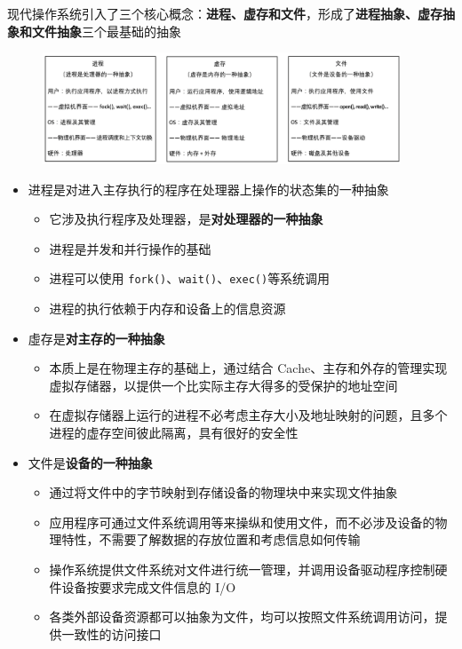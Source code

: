 \documentclass[cs4size,a4paper,10pt]{ctexart}
\begin{document}
		现代操作系统引入了三个核心概念：\textbf{进程、虚存和文件}，形成了\textbf{进程抽象、虚存抽象和文件抽象}三个最基础的抽象
		\begin{figure}[H]
			\centering
			\includegraphics[width=0.95\textwidth]{img/1.3.1.2}
		\end{figure}
		\begin{itemize}
			\item 进程是对进入主存执行的程序在处理器上操作的状态集的一种抽象
			\begin{itemize}
				\item 它涉及执行程序及处理器，是\textbf{对处理器的一种抽象}
				\item 进程是并发和并行操作的基础
				\item 进程可以使用 \verb|fork()|、\verb|wait()|、\verb|exec()|等系统调用
				\item 进程的执行依赖于内存和设备上的信息资源
			\end{itemize}
			\item 虛存是\textbf{对主存的一种抽象}
			\begin{itemize}
				\item 本质上是在物理主存的基础上，通过结合 Cache、主存和外存的管理实现虚拟存储器，以提供一个比实际主存大得多的受保护的地址空间
				\item 在虚拟存储器上运行的进程不必考虑主存大小及地址映射的问题，且多个进程的虚存空间彼此隔离，具有很好的安全性
			\end{itemize}
			\item 文件是\textbf{设备的一种抽象}
			\begin{itemize}
				\item 通过将文件中的字节映射到存储设备的物理块中来实现文件抽象
				\item 应用程序可通过文件系统调用等来操纵和使用文件，而不必涉及设备的物理特性，不需要了解数据的存放位置和考虑信息如何传输
				\item 操作系统提供文件系统对文件进行统一管理，并调用设备驱动程序控制硬件设备按要求完成文件信息的 I/O
				\item 各类外部设备资源都可以抽象为文件，均可以按照文件系统调用访问，提供一致性的访问接口
			\end{itemize}
		\end{itemize}
\end{document}
